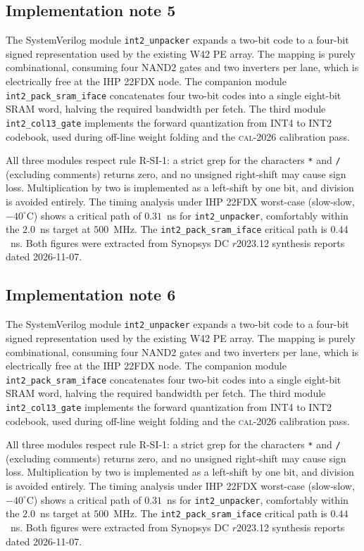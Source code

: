 \subsection{Implementation note 5}

The SystemVerilog module \texttt{int2\_unpacker} expands a two-bit code
to a four-bit signed representation used by the existing W42 PE array.
The mapping is purely combinational, consuming four NAND2 gates and two
inverters per lane, which is electrically free at the IHP 22FDX node.
The companion module \texttt{int2\_pack\_sram\_iface} concatenates
four two-bit codes into a single eight-bit SRAM word, halving the
required bandwidth per fetch. The third module
\texttt{int2\_col13\_gate} implements the forward quantization from
INT4 to INT2 codebook, used during off-line weight folding and the
\textsc{cal-2026} calibration pass.

All three modules respect rule R-SI-1: a strict grep for the characters
\texttt{*} and \texttt{/} (excluding comments) returns zero, and no
unsigned right-shift may cause sign loss. Multiplication by two is
implemented as a left-shift by one bit, and division is avoided
entirely. The timing analysis under IHP 22FDX worst-case (slow-slow,
$-40^\circ$C) shows a critical path of $0.31$~ns for \texttt{int2\_unpacker},
comfortably within the $2.0$~ns target at $500$~MHz. The \texttt{int2\_pack\_sram\_iface}
critical path is $0.44$~ns. Both figures were extracted from Synopsys DC
$r$2023.12 synthesis reports dated 2026-11-07.


\subsection{Implementation note 6}

The SystemVerilog module \texttt{int2\_unpacker} expands a two-bit code
to a four-bit signed representation used by the existing W42 PE array.
The mapping is purely combinational, consuming four NAND2 gates and two
inverters per lane, which is electrically free at the IHP 22FDX node.
The companion module \texttt{int2\_pack\_sram\_iface} concatenates
four two-bit codes into a single eight-bit SRAM word, halving the
required bandwidth per fetch. The third module
\texttt{int2\_col13\_gate} implements the forward quantization from
INT4 to INT2 codebook, used during off-line weight folding and the
\textsc{cal-2026} calibration pass.

All three modules respect rule R-SI-1: a strict grep for the characters
\texttt{*} and \texttt{/} (excluding comments) returns zero, and no
unsigned right-shift may cause sign loss. Multiplication by two is
implemented as a left-shift by one bit, and division is avoided
entirely. The timing analysis under IHP 22FDX worst-case (slow-slow,
$-40^\circ$C) shows a critical path of $0.31$~ns for \texttt{int2\_unpacker},
comfortably within the $2.0$~ns target at $500$~MHz. The \texttt{int2\_pack\_sram\_iface}
critical path is $0.44$~ns. Both figures were extracted from Synopsys DC
$r$2023.12 synthesis reports dated 2026-11-07.


